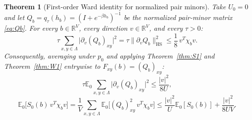 \documentclass[11pt]{article}
\newtheorem{theorem}{Theorem}[section]
\theoremstyle{definition}
\theoremstyle{remark}
\DeclareMathOperator{\HS}{HS}
\newcommand{\E}{\mathbb{E}}
\newcommand{\R}{\mathbb{R}}
\begin{document}
\begin{theorem}[First-order Ward identity for normalized pair minors]
\label{thm:W2}
Take $U_0 = 0$ and let $Q_b = q_\tau(h_b) = (I + e^{-\beta h_b})^{-1}$ be the normalized pair-minor matrix \eqref{eq:Qb}. For every $b \in \R^V$, every direction $v \in \R^V$, and every $\tau > 0$:
\begin{equation}
\tau \sum_{x,y \in \Lambda} \bigl|\partial_v (Q_b)_{xy}\bigr|^2 = \tau \|\partial_v Q_b\|_{\HS}^2 \le \frac{1}{8}\, v^T \chi_b v.
\label{eq:W2_pointwise}
\end{equation}
Consequently, averaging under $p_0$ and applying Theorem~\ref{thm:S1} and Theorem~\ref{thm:W1} entrywise to $F_{xy}(b) = (Q_b)_{xy}$:
\begin{equation}
\tau \E_0 \sum_{x,y \in \Lambda} \bigl|\partial_v (Q_b)_{xy}\bigr|^2 \le \frac{|v|^2}{8U},
\label{eq:W2_grad}
\end{equation}
\begin{equation}
\E_0\bigl[S_0(b)\, v^T \chi_b v\bigr] = \frac{1}{V} \sum_{x,y \in \Lambda} \E_0\bigl[(Q_b)_{xy}^2\, v^T \chi_b v\bigr] \le \frac{|v|^2}{U}\E_0[S_0(b)] + \frac{|v|^2}{8 U V}.
\label{eq:W2_weighted}
\end{equation}
\end{theorem}
\end{document}

